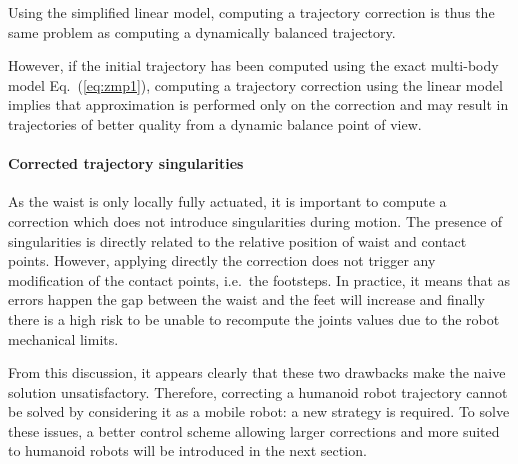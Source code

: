 Using the simplified linear model, computing a trajectory correction is thus
the same problem as computing a dynamically balanced trajectory.

However, if the initial trajectory has been computed using the exact
multi-body model Eq.~(\ref{eq:zmp1}), computing a trajectory correction
using the linear model implies that approximation is performed only on
the correction and may result in trajectories of better quality from a
dynamic balance point of view.

\paragraph{Corrected trajectory singularities}
As the waist is only locally fully actuated, it is important to compute
a correction which does not introduce singularities during motion. The
presence of singularities is directly related to the relative position
of waist and contact points. However, applying directly the correction
does not trigger any modification of the contact points, i.e.\ the
footsteps. In practice, it means that as errors happen the gap between
the waist and the feet will increase and finally there is a high risk
to be unable to recompute the joints values due to the robot
mechanical limits.


From this discussion, it appears clearly that these two drawbacks make
the naive solution unsatisfactory. Therefore, correcting a humanoid
robot trajectory cannot be solved by considering it as a mobile robot:
a new strategy is required. To solve these issues, a better control
scheme allowing larger corrections and more suited to humanoid robots
will be introduced in the next section.


\FloatBarrier


